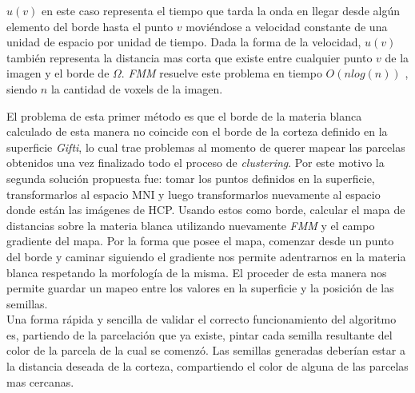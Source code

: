 $u(v)$ en este caso representa el tiempo que tarda la onda en llegar desde
alg\'un elemento del borde hasta el punto $v$ movi\'endose a velocidad constante
de una unidad de espacio por unidad de tiempo. Dada la forma de la velocidad, 
$u(v)$ tambi\'en representa la distancia mas corta que existe entre cualquier
punto $v$ de la imagen y el borde de $\Omega$. \textit{FMM} resuelve este problema
en tiempo $O(n log(n))$ \cite{Sethian2001}, siendo $n$ la cantidad de voxels de 
la imagen.

El problema de esta primer m\'etodo es que el borde de la materia blanca calculado
de esta manera no coincide con el borde de la corteza definido en la superficie
\textit{Gifti}, lo cual trae problemas al momento de querer mapear las parcelas
obtenidos una vez finalizado todo el proceso de \textit{clustering}. Por este
motivo la segunda soluci\'on propuesta fue: tomar los puntos definidos en la 
superficie, transformarlos al espacio MNI y luego transformarlos nuevamente al 
espacio donde est\'an las im\'agenes de HCP. Usando estos como borde, calcular 
el mapa de distancias sobre la materia blanca utilizando nuevamente \textit{FMM}
y el campo gradiente del mapa. Por la forma que posee el mapa, comenzar desde un
punto del borde y caminar siguiendo el gradiente nos permite adentrarnos en la 
materia blanca respetando la morfolog\'ia de la misma. El proceder de esta manera
nos permite guardar un mapeo entre los valores en la superficie y la posici\'on
de las semillas.\\

Una forma r\'apida y sencilla de validar el correcto funcionamiento del algoritmo
es, partiendo de la parcelaci\'on que ya existe, pintar cada semilla resultante 
del color de la parcela de la cual se comenz\'o. Las semillas generadas
deber\'ian estar a la distancia deseada de la corteza, compartiendo el color de
alguna de las parcelas mas cercanas.
